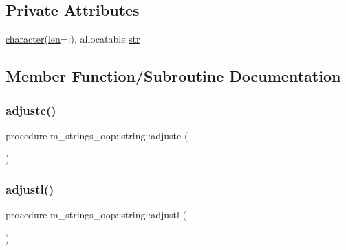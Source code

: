 \subsection*{Private Attributes}
\begin{DoxyCompactItemize}
\item 
\hyperlink{option__stopwatch_83_8txt_abd4b21fbbd175834027b5224bfe97e66}{character}(\hyperlink{structm__strings__oop_1_1string_acd9093a5a0ca686837cce1908846ae53}{len}=\+:), allocatable \hyperlink{structm__strings__oop_1_1string_a52469ac69ef806468520b42894ca5e77}{str}
\end{DoxyCompactItemize}


\subsection{Member Function/\+Subroutine Documentation}
\mbox{\label{structm__strings__oop_1_1string_a00b51e0438ecd366e3a42e28e7b2996b}} 
\subsubsection{\texorpdfstring{adjustc()}{adjustc()}}
{\footnotesize\ttfamily procedure m\+\_\+strings\+\_\+oop\+::string\+::adjustc (\begin{DoxyParamCaption}{ }\end{DoxyParamCaption})\hspace{0.3cm}{\ttfamily [private]}}

\mbox{\label{structm__strings__oop_1_1string_a1f88b4f2a38506e18657f3f1a62e98f9}} 
\subsubsection{\texorpdfstring{adjustl()}{adjustl()}}
{\footnotesize\ttfamily procedure m\+\_\+strings\+\_\+oop\+::string\+::adjustl (\begin{DoxyParamCaption}{ }\end{DoxyParamCaption})\hspace{0.3cm}{\ttfamily [private]}}

